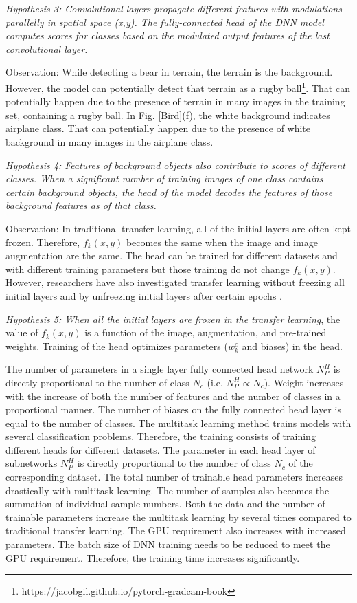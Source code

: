 \documentclass{article}
\begin{document}
\emph{Hypothesis 3: Convolutional layers propagate different features with modulations parallelly in spatial space (x,y). The fully-connected head of the DNN model computes scores for classes based on the modulated output features of the last convolutional layer.}


Observation: While detecting a bear in terrain, the terrain is the background. However, the model can potentially detect that terrain as a rugby ball\footnote{https://jacobgil.github.io/pytorch-gradcam-book}. That can potentially happen due to the presence of terrain in many images in the training set, containing a rugby ball. In Fig. \ref{Bird}(f), the white background indicates airplane class. That can potentially happen due to the presence of white background in many images in the airplane class.

\emph{Hypothesis 4: Features of background objects also contribute to scores of different classes. When a significant number of training images of one class contains certain background objects, the head of the model decodes the features of those background features as of that class.}

Observation: In traditional transfer learning, all of the initial layers are often kept frozen. Therefore, $f_k (x,y)$ becomes the same when the image and image augmentation are the same. The head can be trained for different datasets and with different training parameters but those training do not change $f_k (x,y)$. However, researchers have also investigated transfer learning without freezing all initial layers and by unfreezing initial layers after certain epochs \cite{goodfellow2016deep, guo2019spottune}.

\emph{Hypothesis 5: When all the initial layers are frozen in the transfer learning}, the value of $f_k (x,y)$ is a function of the image, augmentation, and pre-trained weights. Training of the head optimizes parameters ($w_k^c$ and biases) in the head.



The number of parameters in a single layer fully connected head network $N_P^H$ is directly proportional to the number of class $N_c$ (i.e. $N_P^H \propto N_c$). Weight increases with the increase of both the number of features and the number of classes in a proportional manner. The number of biases on the fully connected head layer is equal to the number of classes. 
The multitask learning method trains models with several classification problems. Therefore, the training consists of training different heads for different datasets. The parameter in each head layer of subnetworks $N_P^H$ is directly proportional to the number of class $N_c$ of the corresponding dataset. The total number of trainable head parameters increases drastically with multitask learning. The number of samples also becomes the summation of individual sample numbers. Both the data and the number of trainable parameters increase the multitask learning by several times compared to traditional transfer learning. The GPU requirement also increases with increased parameters. The batch size of DNN training needs to be reduced to meet the GPU requirement. Therefore, the training time increases significantly.
\end{document}

